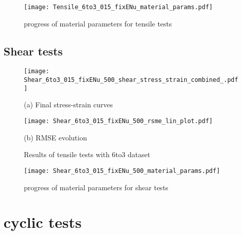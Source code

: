 \begin{figure}[H]
    \centering
    \texttt{[image: Tensile\_6to3\_015\_fixENu\_material\_params.pdf]}
    \caption{progress of material parameters for tensile tests}
    \label{fig:tensileMatParams}
\end{figure}


\subsection{Shear tests}
\begin{figure}[H]
    \centering
    \begin{minipage}[t]{0.495\textwidth}
        \centering
        \texttt{[image: Shear\_6to3\_015\_fixENu\_500\_shear\_stress\_strain\_combined\_.pdf]}
        \caption*{(a) Final stress-strain curves}
        \label{fig:shearStressStrain6to3}
    \end{minipage}
    \hfill
    \begin{minipage}[t]{0.495\textwidth}
        \centering
        \texttt{[image: Shear\_6to3\_015\_fixENu\_500\_rsme\_lin\_plot.pdf]}
        \caption*{(b) RMSE evolution}
        \label{subfigure:shearRMSE}
    \end{minipage}
    \caption{Results of tensile tests with 6to3 dataset}
    \label{fig:shearResults6to3}
\end{figure}


\begin{figure}[H]
    \centering
    \texttt{[image: Shear\_6to3\_015\_fixENu\_500\_material\_params.pdf]}
    \caption{progress of material parameters for shear tests}
    \label{fig:shearMatParams}
\end{figure}


\section{cyclic tests}







